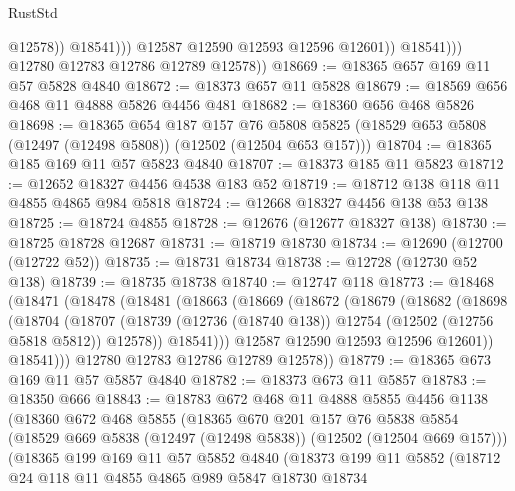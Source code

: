 \begin{lexlean}{RustStd}
\begin{coremodule}
                            @12578))
                        @18541)))
                  @12587
                  @12590
                  @12593
                  @12596
                  @12601))
              @18541)))
        @12780
        @12783
        @12786
        @12789
        @12578))
@18669 := @18365 @657 @169 @11 @57 @5828 @4840
@18672 := @18373 @657 @11 @5828
@18679 := @18569 @656 @468 @11 @4888 @5826 @4456 @481
@18682 := @18360 @656 @468 @5826
@18698 := @18365
    @654
    @187
    @157
    @76
    @5808
    @5825
    (@18529 @653 @5808 (@12497 (@12498 @5808)) (@12502 (@12504 @653 @157)))
@18704 := @18365 @185 @169 @11 @57 @5823 @4840
@18707 := @18373 @185 @11 @5823
@18712 := @12652 @18327 @4456 @4538 @183 @52
@18719 := @18712 @138 @118 @11 @4855 @4865 @984 @5818
@18724 := @12668 @18327 @4456 @138 @53 @138
@18725 := @18724 @4855
@18728 := @12676 (@12677 @18327 @138)
@18730 := @18725 @18728 @12687
@18731 := @18719 @18730
@18734 := @12690 (@12700 (@12722 @52))
@18735 := @18731 @18734
@18738 := @12728 (@12730 @52 @138)
@18739 := @18735 @18738
@18740 := @12747 @118
@18773 := @18468
    (@18471
      (@18478
        (@18481
          (@18663
            (@18669
              (@18672
                (@18679
                  (@18682
                    (@18698
                      (@18704
                        (@18707
                          (@18739
                            (@12736 (@18740 @138))
                            @12754
                            (@12502 (@12756 @5818 @5812))
                            @12578))
                        @18541)))
                  @12587
                  @12590
                  @12593
                  @12596
                  @12601))
              @18541)))
        @12780
        @12783
        @12786
        @12789
        @12578))
@18779 := @18365 @673 @169 @11 @57 @5857 @4840
@18782 := @18373 @673 @11 @5857
@18783 := @18350 @666
@18843 := @18783
    @672
    @468
    @11
    @4888
    @5855
    @4456
    @1138
    (@18360
      @672
      @468
      @5855
      (@18365
        @670
        @201
        @157
        @76
        @5838
        @5854
        (@18529 @669 @5838 (@12497 (@12498 @5838)) (@12502 (@12504 @669 @157)))
        (@18365
          @199
          @169
          @11
          @57
          @5852
          @4840
          (@18373
            @199
            @11
            @5852
            (@18712
              @24
              @118
              @11
              @4855
              @4865
              @989
              @5847
              @18730
              @18734

\end{coremodule}
\end{lexlean}
